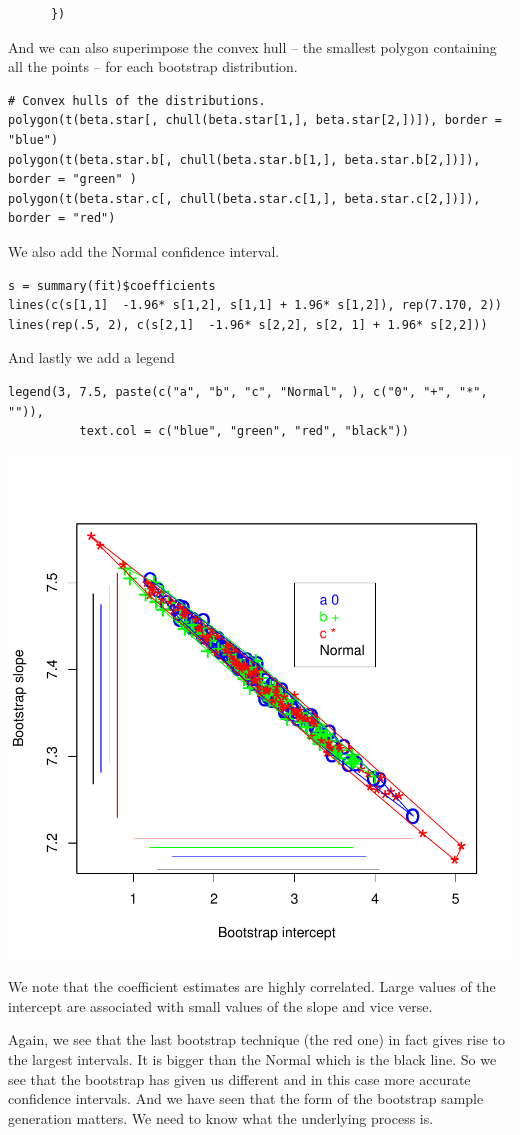 \documentclass{article}
\begin{document}
\begin{description}
\begin{verbatim}
      })
\end{verbatim}

And we can also superimpose the convex hull -- the smallest polygon
containing all the points -- for each bootstrap distribution.
\begin{verbatim}
# Convex hulls of the distributions.
polygon(t(beta.star[, chull(beta.star[1,], beta.star[2,])]), border = "blue")
polygon(t(beta.star.b[, chull(beta.star.b[1,], beta.star.b[2,])]), border = "green" )
polygon(t(beta.star.c[, chull(beta.star.c[1,], beta.star.c[2,])]), border = "red")
\end{verbatim}
We also add the Normal confidence interval.
\begin{verbatim}
s = summary(fit)$coefficients
lines(c(s[1,1]  -1.96* s[1,2], s[1,1] + 1.96* s[1,2]), rep(7.170, 2))
lines(rep(.5, 2), c(s[2,1]  -1.96* s[2,2], s[2, 1] + 1.96* s[2,2]))
\end{verbatim}

And lastly we add a legend
\begin{verbatim}
legend(3, 7.5, paste(c("a", "b", "c", "Normal", ), c("0", "+", "*", "")),
          text.col = c("blue", "green", "red", "black"))
\end{verbatim}

\includegraphics{images/BootstrapsCIs.pdf}

We note that the coefficient estimates are highly correlated.  Large
values of the intercept are associated with small values of the slope
and vice verse.

Again, we see that the last bootstrap technique (the red one) in fact
gives rise to the largest intervals.  It is bigger than the Normal
which is the black line.  So we see that the bootstrap has given us
different and in this case more accurate confidence intervals.  And we
have seen that the form of the bootstrap sample generation matters. We
need to know what the underlying process is.

\end{description}
\end{document}
